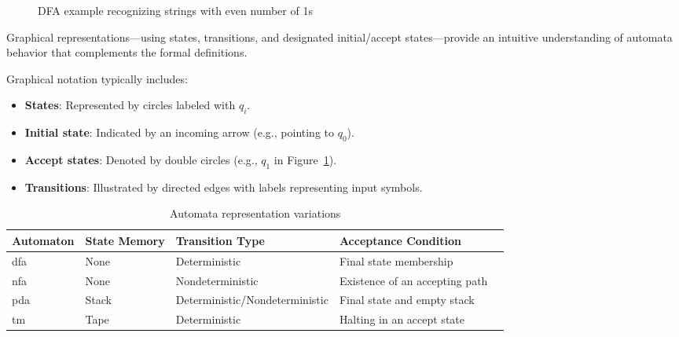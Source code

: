 \begin{figure}[htbp]
    \centering
    \caption{DFA example recognizing strings with even number of 1s}
    \label{fig:cfa-example}
\end{figure}

\begin{observation}
Graphical representations—using states, transitions, and designated initial/accept states—provide an intuitive understanding of automata behavior that complements the formal definitions.
\end{observation}

Graphical notation typically includes:
\begin{itemize}
    \item \textbf{States}: Represented by circles labeled with $q_i$.
    \item \textbf{Initial state}: Indicated by an incoming arrow (e.g., pointing to $q_0$).
    \item \textbf{Accept states}: Denoted by double circles (e.g., $q_1$ in Figure~\ref{fig:cfa-example}).
    \item \textbf{Transitions}: Illustrated by directed edges with labels representing input symbols.
\end{itemize}

\begin{table}[htbp]
    \centering
    \begin{adjustbox}{max width=\textwidth}
      \begin{tabular}{@{}lllll@{}}
          \toprule
          \textbf{Automaton} & \textbf{State Memory} & \textbf{Transition Type} & \textbf{Acceptance Condition} \\ \midrule
          \gls{dfa} & None & Deterministic & Final state membership \cite{hopcroft2006introduction} \\
          \gls{nfa} & None & Nondeterministic & Existence of an accepting path \cite{hopcroft2006introduction} \\
          \gls{pda} & Stack & Deterministic/Nondeterministic & Final state and empty stack \cite{chomsky1956three} \\
          \gls{tm} & Tape & Deterministic & Halting in an accept state \cite{turing1936computable} \\
          \bottomrule
      \end{tabular}
    \end{adjustbox}
    \caption{Automata representation variations}
    \label{tab:automata-variations}
\end{table}
